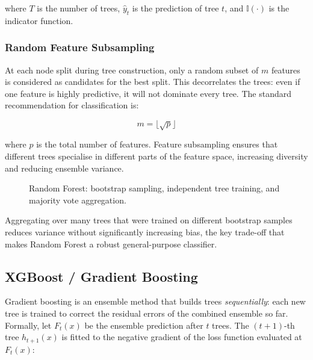 \documentclass[10pt,a4paper]{article}
\begin{document}
where $T$ is the number of trees, $\hat{y}_t$ is the prediction of tree $t$, and $\mathbb{I}(\cdot)$ is the indicator function.

\subsubsection{Random Feature Subsampling}

At each node split during tree construction, only a random subset of $m$ features is considered as candidates for the best split. This decorrelates the trees: even if one feature is highly predictive, it will not dominate every tree. The standard recommendation for classification is:

\begin{equation}
m = \lfloor \sqrt{p} \rfloor
\label{eq:rf-features}
\end{equation}

where $p$ is the total number of features. Feature subsampling ensures that different trees specialise in different parts of the feature space, increasing diversity and reducing ensemble variance.

\begin{figure}[H]
    \centering
    \caption{Random Forest: bootstrap sampling, independent tree training, and majority vote aggregation.}
    \label{fig:random-forest-architecture}
\end{figure}

Aggregating over many trees that were trained on different bootstrap samples reduces variance without significantly increasing bias, the key trade-off that makes Random Forest a robust general-purpose classifier.

\subsection{XGBoost / Gradient Boosting}
\label{sec:xgboost}

Gradient boosting is an ensemble method that builds trees \emph{sequentially}: each new tree is trained to correct the residual errors of the combined ensemble so far. Formally, let $F_t(x)$ be the ensemble prediction after $t$ trees. The $(t+1)$-th tree $h_{t+1}(x)$ is fitted to the negative gradient of the loss function evaluated at $F_t(x)$:
\end{document}
